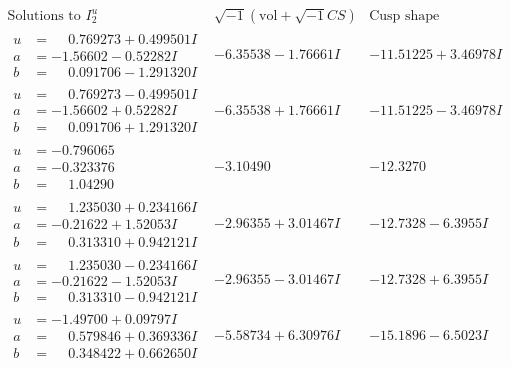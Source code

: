 \documentclass[1p]{elsarticle_modified}
\theoremstyle{definition}
\newcommand{\I}{\sqrt{-1}}
\begin{document}
$$\begin{array}{c|c|c}  
\text{Solutions to }I^u_{2}& \I (\text{vol} + \sqrt{-1}CS) & \text{Cusp shape}\\
 \hline 
\begin{aligned}
u &= \phantom{-}0.769273 + 0.499501 I \\
a &= -1.56602 - 0.52282 I \\
b &= \phantom{-}0.091706 - 1.291320 I\end{aligned}
 & -6.35538 - 1.76661 I & -11.51225 + 3.46978 I \\ \hline\begin{aligned}
u &= \phantom{-}0.769273 - 0.499501 I \\
a &= -1.56602 + 0.52282 I \\
b &= \phantom{-}0.091706 + 1.291320 I\end{aligned}
 & -6.35538 + 1.76661 I & -11.51225 - 3.46978 I \\ \hline\begin{aligned}
u &= -0.796065\phantom{ +0.000000I} \\
a &= -0.323376\phantom{ +0.000000I} \\
b &= \phantom{-}1.04290\phantom{ +0.000000I}\end{aligned}
 & -3.10490\phantom{ +0.000000I} & -12.3270\phantom{ +0.000000I} \\ \hline\begin{aligned}
u &= \phantom{-}1.235030 + 0.234166 I \\
a &= -0.21622 + 1.52053 I \\
b &= \phantom{-}0.313310 + 0.942121 I\end{aligned}
 & -2.96355 + 3.01467 I & -12.7328 - 6.3955 I \\ \hline\begin{aligned}
u &= \phantom{-}1.235030 - 0.234166 I \\
a &= -0.21622 - 1.52053 I \\
b &= \phantom{-}0.313310 - 0.942121 I\end{aligned}
 & -2.96355 - 3.01467 I & -12.7328 + 6.3955 I \\ \hline\begin{aligned}
u &= -1.49700 + 0.09797 I \\
a &= \phantom{-}0.579846 + 0.369336 I \\
b &= \phantom{-}0.348422 + 0.662650 I\end{aligned}
 & -5.58734 + 6.30976 I & -15.1896 - 6.5023 I \\ \hline\begin{aligned}

\end{aligned}
\end{array}$$
\end{document}
